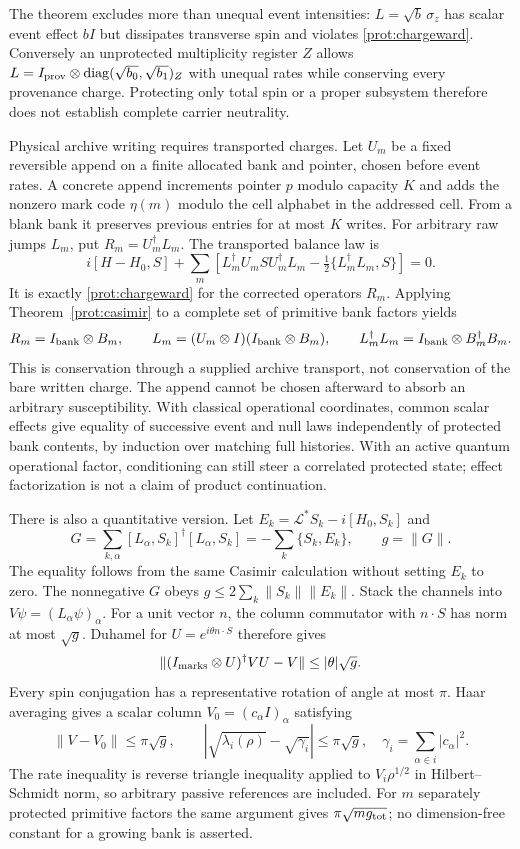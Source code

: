 \documentclass[11pt,oneside,openany]{book}
\theoremstyle{definition}
\theoremstyle{remark}\newtheorem{remark}[theorem]{Remark}
\begin{document}
The theorem excludes more than unequal event intensities: $L=\sqrt b\,\sigma_z$ has scalar event effect $bI$ but dissipates transverse spin and violates \eqref{prot:chargeward}. Conversely an unprotected multiplicity register $Z$ allows $L=I_{\rm prov}\otimes\operatorname{diag}(\sqrt{b_0},\sqrt{b_1})_Z$ with unequal rates while conserving every provenance charge. Protecting only total spin or a proper subsystem therefore does not establish complete carrier neutrality.

Physical archive writing requires transported charges. Let $U_m$ be a fixed reversible append on a finite allocated bank and pointer, chosen before event rates. A concrete append increments pointer $p$ modulo capacity $K$ and adds the nonzero mark code $\eta(m)$ modulo the cell alphabet in the addressed cell. From a blank bank it preserves previous entries for at most $K$ writes. For arbitrary raw jumps $L_m$, put $R_m=U_m^\dagger L_m$. The transported balance law is
\[
 i[H-H_0,S]+\sum_m\left[
 L_m^\dagger U_m S U_m^\dagger L_m
             -\tfrac12\{L_m^\dagger L_m,S\}\right]=0.
\]
It is exactly \eqref{prot:chargeward} for the corrected operators $R_m$. Applying Theorem~\ref{prot:casimir} to a complete set of primitive bank factors yields
\[
 R_m=I_{\rm bank}\otimes B_m,\qquad
 L_m=(U_m\otimes I)(I_{\rm bank}\otimes B_m),
 \qquad L_m^\dagger L_m=I_{\rm bank}\otimes B_m^\dagger B_m.
\]
This is conservation through a supplied archive transport, not conservation of the bare written charge. The append cannot be chosen afterward to absorb an arbitrary susceptibility. With classical operational coordinates, common scalar effects give equality of successive event and null laws independently of protected bank contents, by induction over matching full histories. With an active quantum operational factor, conditioning can still steer a correlated protected state; effect factorization is not a claim of product continuation.

There is also a quantitative version. Let $E_k=\mathcal L^*S_k-i[H_0,S_k]$ and
\[
 G=\sum_{k,\alpha}[L_\alpha,S_k]^\dagger[L_\alpha,S_k]
   =-\sum_k\{S_k,E_k\},\qquad g=\|G\|.
\]
The equality follows from the same Casimir calculation without setting $E_k$ to zero. The nonnegative $G$ obeys $g\le2\sum_k\|S_k\|\|E_k\|$. Stack the channels into $V\psi=(L_\alpha\psi)_\alpha$. For a unit vector $n$, the column commutator with $n\cdot S$ has norm at most $\sqrt g$. Duhamel for $U=e^{i\theta n\cdot S}$ therefore gives
\[
 \|(I_{\rm marks}\otimes U)^\dagger VU-V\|\le|\theta|\sqrt g.
\]
Every spin conjugation has a representative rotation of angle at most $\pi$. Haar averaging gives a scalar column $V_0=(c_\alpha I)_\alpha$ satisfying
\begin{equation}
 \|V-V_0\|\le\pi\sqrt g,
 \qquad |\sqrt{\lambda_i(\rho)}-\sqrt{\gamma_i}|\le\pi\sqrt g,
 \quad\gamma_i=\sum_{\alpha\in i}|c_\alpha|^2.
 \label{prot:roothazard}
\end{equation}
The rate inequality is reverse triangle inequality applied to $V_i\rho^{1/2}$ in Hilbert--Schmidt norm, so arbitrary passive references are included. For $m$ separately protected primitive factors the same argument gives $\pi\sqrt{m g_{\rm tot}}$; no dimension-free constant for a growing bank is asserted.
\end{document}
